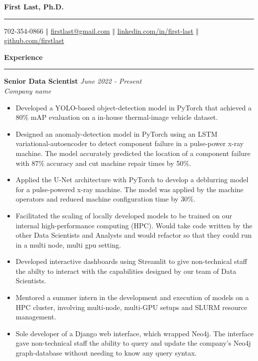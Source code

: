\documentclass[11pt]{article}
\begin{document}
\thispagestyle{empty}

\begin{center}
  \bf \Huge  First Last, Ph.D.
  \vspace{.1em}
  \hrule
\end{center}

\begin{center}
  \vspace{.4em}
  702-354-0866 $\Big \Vert$
  \href{mailto:firstlast@gmail.com}{firstlast@gmail.com} $\Big \Vert$ 
  \href{https://www.linkedin.com/in/first-last/}{linkedin.com/in/first-last} $\Big \Vert$
  \href{https://github.com/firstlast}{github.com/firstlast}
\end{center}

\textbf{\Large Experience}
\vspace{.3em}
\hrule
\vspace{.3em}

\textbf{\large Senior Data Scientist} \hfill \textit{June 2022 - Present}\\
\textit{Company name} 

\begin{itemize} \setlength\itemsep{-0.5em}
  \item Developed a YOLO-based object-detection model in PyTorch that achieved a 
    80\% mAP evaluation on a in-house thermal-image vehicle dataset. 

  \item Designed an anomaly-detection model in PyTorch using an LSTM 
    variational-autoencoder to detect component failure in a pulse-power x-ray 
    machine. The model accurately predicted the location of a component failure with 
    87\% accuracy and cut machine repair times by 50\%.

  \item Applied the U-Net architecture with PyTorch to develop a deblurring model for 
    a pulse-powered x-ray machine. The model was applied by the machine operators 
    and reduced machine configuration time by 30\%.

  \item Facilitated the scaling of locally developed models to be trained on our internal
    high-performance computing (HPC). Would take code written by the other 
    Data Scientists and Analysts and would refactor so that they could run in a 
    multi node, multi gpu setting. 

  \item Developed interactive dashboards using Streamlit to give non-technical staff the
    abilty to interact with the capabilities designed by our team of Data Scientists.

  \item Mentored a summer intern in the development and execution of models on a 
    HPC cluster, involving multi-node, multi-GPU setups and SLURM resource management.

  \item Sole developer of a Django web interface, which wrapped Neo4j. The interface
    gave non-technical staff the ability to query and update the company's Neo4j
    graph-database without needing to know any query syntax.

\end{itemize}
\end{document}
